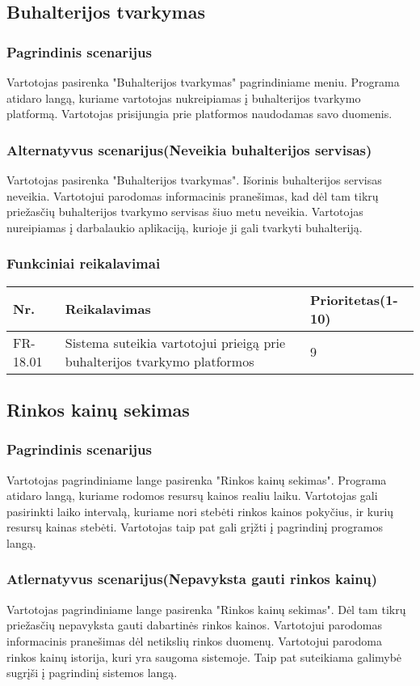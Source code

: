 \documentclass[oneside]{VUMIFPSkursinis}
\begin{document}
\subsection{Buhalterijos tvarkymas}
	\subsubsection{Pagrindinis scenarijus}
	Vartotojas pasirenka "Buhalterijos tvarkymas" pagrindiniame meniu. Programa atidaro langą, kuriame vartotojas nukreipiamas į buhalterijos tvarkymo platformą. Vartotojas prisijungia prie platformos naudodamas savo duomenis.
	\subsubsection{Alternatyvus scenarijus(Neveikia buhalterijos servisas)}
	Vartotojas pasirenka "Buhalterijos tvarkymas". Išorinis buhalterijos servisas neveikia. Vartotojui parodomas informacinis pranešimas, kad dėl tam tikrų priežasčių buhalterijos tvarkymo servisas šiuo metu neveikia. Vartotojas nureipiamas į darbalaukio aplikaciją, kurioje ji gali tvarkyti buhalteriją.
	\subsubsection{Funkciniai reikalavimai}
	\begin{table}[htbp]
	\begin{tabularx}{1\textwidth}{ |P{2.5cm}|X|P{3cm }| }  \hline
		Nr. & Reikalavimas & Prioritetas(1-10) \\ \hline
		FR-18.01 & Sistema suteikia vartotojui prieigą prie buhalterijos tvarkymo platformos & 9 \\ \hline
	\end{tabularx}
\end{table}
\subsection{Rinkos kainų sekimas}
	\subsubsection{Pagrindinis scenarijus}
	Vartotojas pagrindiniame lange pasirenka "Rinkos kainų sekimas". Programa atidaro langą, kuriame rodomos resursų kainos realiu laiku. Vartotojas gali pasirinkti laiko intervalą, kuriame nori stebėti rinkos kainos pokyčius, ir kurių resursų kainas stebėti. Vartotojas taip pat gali grįžti į pagrindinį programos langą.
	\subsubsection{Atlernatyvus scenarijus(Nepavyksta gauti rinkos kainų)}
	Vartotojas pagrindiniame lange pasirenka "Rinkos kainų sekimas". Dėl tam tikrų priežasčių nepavyksta gauti dabartinės rinkos kainos. Vartotojui parodomas informacinis pranešimas dėl netikslių rinkos duomenų. Vartotojui parodoma rinkos kainų istorija, kuri yra saugoma sistemoje. Taip pat suteikiama galimybė sugrįši į pagrindinį sistemos langą.
\end{document}
